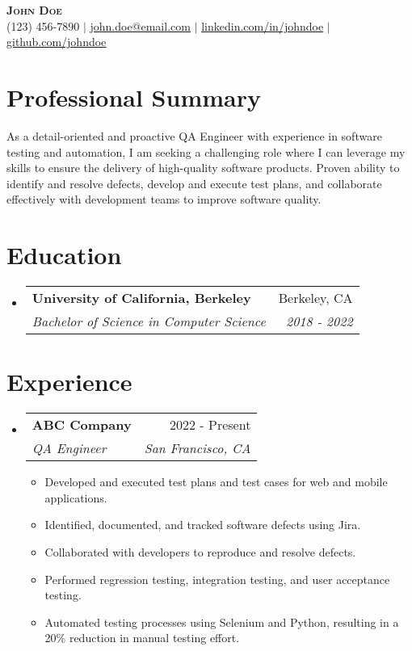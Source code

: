 \documentclass[letterpaper,11pt]{article}
\makeatletter
\newcommand{\resumeItem}[1]{
\item\small{
{#1 \vspace{-2pt}}
}
}
\newcommand{\resumeSubheading}[4]{
\vspace{-2pt}\item
\begin{tabular*}{0.97\textwidth}[t]{l@{\extracolsep{\fill}}r}
\textbf{#1} & #2 \\
\textit{\small#3} & \textit{\small #4} \\
\end{tabular*}\vspace{-7pt}
}
\newcommand{\resumeSubHeadingListStart}{\begin{itemize}[leftmargin=0.15in, label={}]}
\newcommand{\resumeSubHeadingListEnd}{\end{itemize}}
\newcommand{\resumeItemListStart}{\begin{itemize}}
\newcommand{\resumeItemListEnd}{\end{itemize}\vspace{-5pt}}
\makeatother
\begin{document}
\begin{center}
\textbf{\Huge \scshape John Doe} \\ \vspace{1pt}
\small (123) 456-7890 $|$ \href{mailto:john.doe@email.com}{\underline{john.doe@email.com}} $|$
\href{https://www.linkedin.com/in/johndoe}{\underline{linkedin.com/in/johndoe}} $|$
\href{https://github.com/johndoe}{\underline{github.com/johndoe}}
\end{center}


\section{Professional Summary} %
As a detail-oriented and proactive QA Engineer with experience in software testing and automation, I am seeking a challenging role where I can leverage my skills to ensure the delivery of high-quality software products. Proven ability to identify and resolve defects, develop and execute test plans, and collaborate effectively with development teams to improve software quality.

\section{Education}
\resumeSubHeadingListStart
\resumeSubheading{University of California, Berkeley}{Berkeley, CA}{Bachelor of Science in Computer Science}{2018 - 2022}
\resumeSubHeadingListEnd

\section{Experience}
\resumeSubHeadingListStart
\resumeSubheading{ABC Company}{2022 - Present}{QA Engineer}{San Francisco, CA}
\resumeItemListStart
\resumeItem{Developed and executed test plans and test cases for web and mobile applications.}
\resumeItem{Identified, documented, and tracked software defects using Jira.}
\resumeItem{Collaborated with developers to reproduce and resolve defects.}
\resumeItem{Performed regression testing, integration testing, and user acceptance testing.}
\resumeItem{Automated testing processes using Selenium and Python, resulting in a 20\% reduction in manual testing effort.}
\resumeItemListEnd
\resumeSubHeadingListEnd
\end{document}
